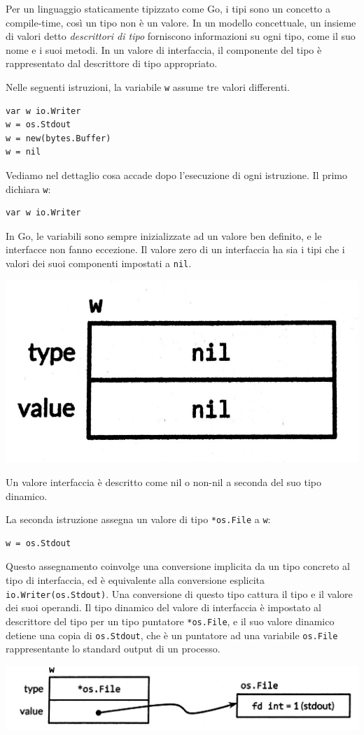 Per un linguaggio staticamente tipizzato come Go, i tipi sono un concetto a compile-time, così un tipo non è un valore.
In un modello concettuale, un insieme di valori detto \textit{descrittori di tipo} forniscono informazioni su ogni tipo, come il suo nome e i suoi metodi.
In un valore di interfaccia, il componente del tipo è rappresentato dal descrittore di tipo appropriato.

Nelle seguenti istruzioni, la variabile \verb|w| assume tre valori differenti.
\begin{lstlisting}[frame=single, label={lst:lstlisting6-5.1}]
var w io.Writer
w = os.Stdout
w = new(bytes.Buffer)
w = nil
\end{lstlisting}
Vediamo nel dettaglio cosa accade dopo l'esecuzione di ogni istruzione.
Il primo dichiara \verb|w|:
\begin{lstlisting}[frame=single, label={lst:lstlisting6-5.2}]
var w io.Writer
\end{lstlisting}
In Go, le variabili sono sempre inizializzate ad un valore ben definito, e le interfacce non fanno eccezione.
Il valore zero di un interfaccia ha sia i tipi che i valori dei suoi componenti impostati a \verb|nil|.
\begin{center}
    \includegraphics[width=0.4\linewidth]{figures/figura6.1}
\end{center}

Un valore interfaccia è descritto come nil o non-nil a seconda del suo tipo dinamico.

La seconda istruzione assegna un valore di tipo \verb|*os.File| a \verb|w|:
\begin{lstlisting}[frame=single, label={lst:lstlisting6-5.3}]
w = os.Stdout
\end{lstlisting}
Questo assegnamento coinvolge una conversione implicita da un tipo concreto al tipo di interfaccia, ed è equivalente alla conversione esplicita \verb|io.Writer(os.Stdout)|.
Una conversione di questo tipo cattura il tipo e il valore dei suoi operandi.
Il tipo dinamico del valore di interfaccia è impostato al descrittore del tipo per un tipo puntatore \verb|*os.File|, e il suo valore dinamico detiene una copia di \verb|os.Stdout|, che è un puntatore ad una variabile \verb|os.File| rappresentante lo standard output di un processo.
\begin{center}
    \includegraphics[width=0.5\linewidth]{figures/figura6.2}
\end{center}

